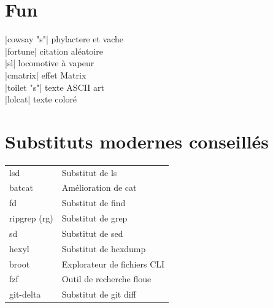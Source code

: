 \documentclass[9pt]{extarticle}
\newenvironment{cmdblock}{%
  \par\setlength{\parindent}{0pt}\setlength{\parskip}{0pt}%
  \RaggedRight%
}{\par}
\begin{document}
\begin{multicols}{4}
\section*{Fun}

\begin{cmdblock}
\code|cowsay "s"| \quad phylactere et vache \\
\code|fortune| \quad citation aléatoire  \\
\code|sl| \quad locomotive à vapeur  \\
\code|cmatrix| \quad effet Matrix  \\
\code|toilet "s"| \quad texte ASCII art  \\
\code|lolcat| \quad texte coloré  \\
\end{cmdblock}

\section*{Substituts modernes conseillés}

\begin{tabularx}{\columnwidth}{lX}
lsd & Substitut de ls  \\
batcat& Amélioration de cat  \\
fd & Substitut de find  \\
ripgrep (rg) & Substitut de grep  \\
sd & Substitut de sed  \\
hexyl & Substitut de hexdump  \\
broot & Explorateur de fichiers CLI  \\
fzf & Outil de recherche floue  \\
git-delta & Substitut de git diff \\
\end{tabularx}

\end{multicols}
\end{document}
